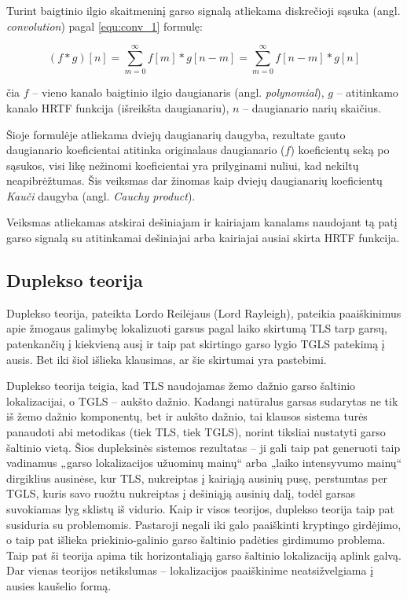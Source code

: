 \documentclass[]{vgtuef}
\begin{document}
Turint baigtinio ilgio skaitmeninį garso signalą atliekama diskrečioji sąsuka (angl. \textit{convolution}) pagal \ref{equ:conv_1} formulę:

\begin{equation}
(f * g)[n] = \sum_{m=0}^{\infty} f[m]*g[n-m]=\sum_{m=0}^{\infty} f[n-m]*g[n]
  \label{equ:conv_1}
\end{equation}

čia $f$ – vieno kanalo baigtinio ilgio daugianaris (angl. \textit{polynomial}), $g$ – atitinkamo kanalo HRTF funkcija (išreikšta daugianariu), $n$ – daugianario narių skaičius.

Šioje formulėje atliekama dviejų daugianarių daugyba, rezultate gauto daugianario koeficientai atitinka originalaus daugianario ($f$) koeficientų seką po sąsukos, visi likę nežinomi koeficientai yra prilyginami nuliui, kad nekiltų neapibrėžtumas. Šis veiksmas dar žinomas kaip dviejų daugianarių koeficientų \textit{Kauči} daugyba (angl. \textit{Cauchy product}).

Veiksmas atliekamas atskirai dešiniajam ir kairiajam kanalams naudojant tą patį garso signalą su atitinkamai dešiniajai arba kairiajai ausiai skirta HRTF funkcija.

\subsection{Duplekso teorija}

Duplekso teorija, pateikta Lordo Reilėjaus (Lord Rayleigh), pateikia paaiškinimus apie žmogaus galimybę lokalizuoti garsus pagal laiko skirtumą TLS tarp garsų, patenkančių į kiekvieną ausį ir taip pat skirtingo garso lygio TGLS patekimą į ausis. Bet iki šiol išlieka klausimas, ar šie skirtumai yra pastebimi.

Duplekso teorija teigia, kad TLS naudojamas žemo dažnio garso šaltinio lokalizacijai, o TGLS – aukšto dažnio. Kadangi natūralus garsas sudarytas ne tik iš žemo dažnio komponentų, bet ir aukšto dažnio, tai klausos sistema turės panaudoti abi metodikas (tiek TLS, tiek TGLS), norint tiksliai nustatyti garso šaltinio vietą. Šios dupleksinės sistemos rezultatas – ji gali taip pat generuoti taip vadinamus „garso lokalizacijos užuominų mainų“  arba „laiko intensyvumo mainų“ dirgiklius ausinėse, kur TLS, nukreiptas į kairiąją ausinių pusę, perstumtas per TGLS, kuris savo ruožtu nukreiptas į dešiniąją ausinių dalį, todėl garsas suvokiamas lyg sklistų iš vidurio. Kaip ir visos teorijos, duplekso teorija taip pat susiduria su problemomis. Pastaroji negali iki galo paaiškinti kryptingo girdėjimo, o taip pat išlieka priekinio-galinio garso šaltinio padėties girdimumo problema. Taip pat ši teorija apima tik horizontaliąją garso šaltinio lokalizaciją aplink galvą. Dar vienas teorijos netikslumas – lokalizacijos paaiškinime neatsižvelgiama į ausies kaušelio formą.
\end{document}
